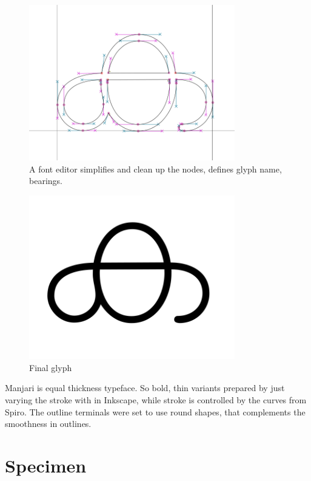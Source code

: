 \documentclass[11pt,twoside,a4paper]{article}
\begin{document}
\begin{figure}[h!]
	\includegraphics[width=0.8\textwidth]{images/design-3-cubic-bezier-in-font-editor.png}
	\caption{A font editor simplifies and clean up the nodes, defines glyph name, bearings.}
	\label{design-3}
\end{figure}

\begin{figure}[h!]
	\includegraphics[width=0.8\textwidth]{images/design-4-final.png}
	\caption{Final glyph}
	\label{design-4}
\end{figure}

Manjari is equal thickness typeface. So bold, thin variants prepared by just varying the stroke with in Inkscape, while stroke is controlled by the curves from Spiro. The outline terminals were set to use round shapes, that complements the smoothness in outlines.
\clearpage
\section{Specimen}
\end{document}

